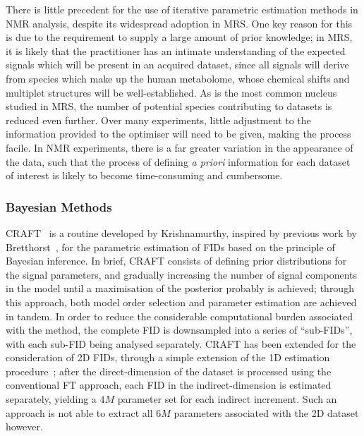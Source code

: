 There is little precedent for the use of iterative parametric estimation
methods \label{corr:varpro-amares}
in \ac{NMR} analysis, despite its widespread adoption in \ac{MRS}. One key reason
for this is due to the requirement to supply a large amount of prior knowledge;
in \ac{MRS}, it is likely that the practitioner has an intimate understanding
of the expected signals
which will be present in an acquired dataset, since all signals will derive
from species which make up the human metabolome, whose chemical shifts and multiplet
structures will be well-established. As  is the most
common nucleus studied in \ac{MRS}, the number of potential species
contributing to datasets is reduced even further. Over many experiments, little
adjustment to the information provided to the optimiser will need to be given,
making the process facile. In \ac{NMR} experiments, there is a far greater
variation in the appearance of the data, such that the process of defining
\textit{a priori} information for each dataset of interest is likely to become
time-consuming and cumbersome.

\subsubsection{Bayesian Methods}
\Ac{CRAFT}~\cite{Krishnamurthy2013,Krishnamurthy2021} is a routine developed by
Krishnamurthy, inspired by previous work by
Bretthorst~\cite{Bretthorst1990a,Bretthorst1990b,Bretthorst1990c,Bretthorst1991,Bretthorst1992},
for the parametric estimation of \acp{FID} based on the principle of Bayesian
inference.
In brief, \ac{CRAFT} consists of defining prior distributions for the signal
parameters, and gradually increasing the number of signal components in the
model until a maximisation of the posterior probably is achieved; through this
approach, both model order selection and parameter estimation are achieved
in tandem. In order to reduce the considerable computational burden associated
with the method, the complete \ac{FID} is downsampled into a series of
``sub-\acp{FID}'', with each sub-\ac{FID} being analysed separately.
\ac{CRAFT} has been extended for the consideration of \ac{2D} \acp{FID},
through a simple extension of the \ac{1D} estimation
procedure~\cite{Krishnamurthy2017}; after the direct-dimension of the dataset is
processed using the conventional \ac{FT} approach, each \ac{FID} in the
indirect-dimension is estimated separately, yielding a $4M$ parameter
set for each indirect increment. Such an approach is not able to extract all
$6M$ parameters associated with the \ac{2D} dataset however.

